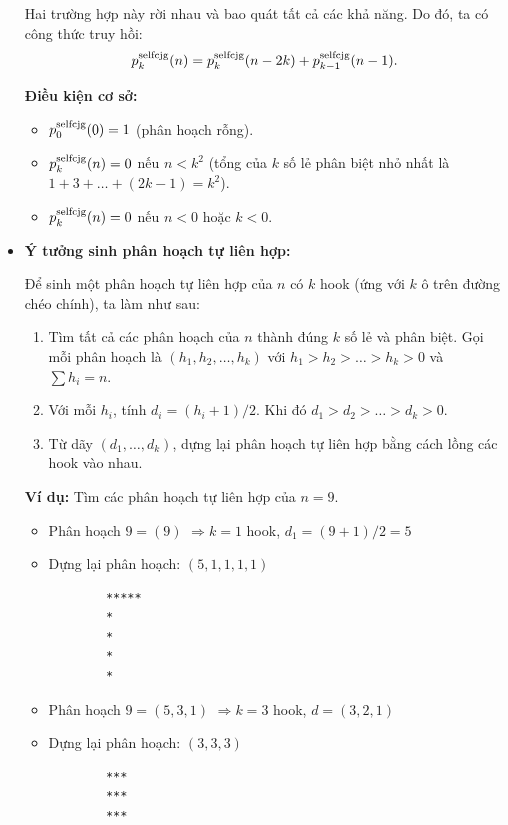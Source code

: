 \documentclass{article}
\begin{document}
\begin{itemize}
    Hai trường hợp này rời nhau và bao quát tất cả các khả năng. Do đó, ta có công thức truy hồi:
    $$
        p_k^{\rm selfcjg}(n) = p_k^{\rm selfcjg}(n-2k) + p_{k-1}^{\rm selfcjg}(n-1).
    $$

    \textbf{Điều kiện cơ sở:}
    \begin{itemize}
        \item $p_0^{\rm selfcjg}(0) = 1$ (phân hoạch rỗng).
        \item $p_k^{\rm selfcjg}(n) = 0$ nếu $n < k^2$ (tổng của $k$ số lẻ phân biệt nhỏ nhất là $1+3+\dots+(2k-1)=k^2$).
        \item $p_k^{\rm selfcjg}(n) = 0$ nếu $n<0$ hoặc $k<0$.
    \end{itemize}

    \item \textbf{Ý tưởng sinh phân hoạch tự liên hợp:}

    Để sinh một phân hoạch tự liên hợp của $n$ có $k$ hook (ứng với $k$ ô trên đường chéo chính), ta làm như sau:

    \begin{enumerate}
        \item Tìm tất cả các phân hoạch của $n$ thành đúng $k$ số lẻ và phân biệt. Gọi mỗi phân hoạch là $(h_1, h_2, \dots, h_k)$ với $h_1 > h_2 > \dots > h_k > 0$ và $\sum h_i = n$.
        \item Với mỗi $h_i$, tính $d_i = (h_i + 1)/2$. Khi đó $d_1 > d_2 > \dots > d_k > 0$.
        \item Từ dãy $(d_1, \dots, d_k)$, dựng lại phân hoạch tự liên hợp bằng cách lồng các hook vào nhau.
    \end{enumerate}

    \textbf{Ví dụ:} Tìm các phân hoạch tự liên hợp của $n = 9$.

    \begin{itemize}
        \item Phân hoạch $9 = (9)$ $\Rightarrow k=1$ hook, $d_1 = (9+1)/2 = 5$
        \item Dựng lại phân hoạch: $(5,1,1,1,1)$
        \begin{verbatim}
        *****
        *
        *
        *
        *
        \end{verbatim}

        \item Phân hoạch $9 = (5,3,1)$ $\Rightarrow k=3$ hook, $d = (3,2,1)$
        \item Dựng lại phân hoạch: $(3,3,3)$
        \begin{verbatim}
        ***
        ***
        ***
        \end{verbatim}
    \end{itemize}


\end{itemize}
\end{document}
